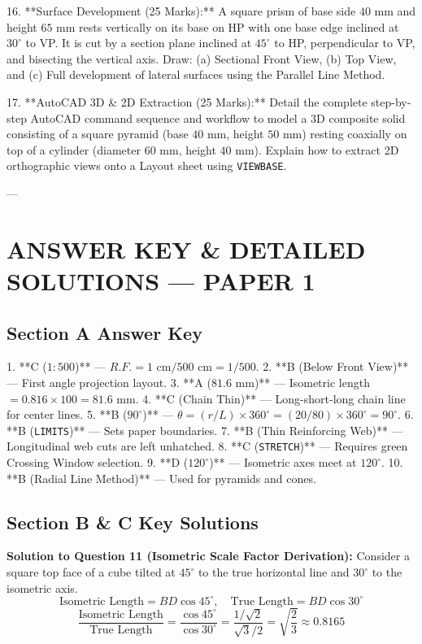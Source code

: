 16. **Surface Development (25 Marks):**  
    A square prism of base side $40\text{ mm}$ and height $65\text{ mm}$ rests vertically on its base on HP with one base edge inclined at $30^\circ$ to VP. It is cut by a section plane inclined at $45^\circ$ to HP, perpendicular to VP, and bisecting the vertical axis. Draw: (a) Sectional Front View, (b) Top View, and (c) Full development of lateral surfaces using the Parallel Line Method.

17. **AutoCAD 3D \& 2D Extraction (25 Marks):**  
    Detail the complete step-by-step AutoCAD command sequence and workflow to model a 3D composite solid consisting of a square pyramid (base $40\text{ mm}$, height $50\text{ mm}$) resting coaxially on top of a cylinder (diameter $60\text{ mm}$, height $40\text{ mm}$). Explain how to extract 2D orthographic views onto a Layout sheet using \texttt{VIEWBASE}.

---

\section{ANSWER KEY \& DETAILED SOLUTIONS — PAPER 1}

\subsection{Section A Answer Key}
1. **C ($1:500$)** — $R.F. = 1\text{ cm} / 500\text{ cm} = 1/500$.
2. **B (Below Front View)** — First angle projection layout.
3. **A ($81.6\text{ mm}$)** — Isometric length $= 0.816 \times 100 = 81.6\text{ mm}$.
4. **C (Chain Thin)** — Long-short-long chain line for center lines.
5. **B ($90^\circ$)** — $\theta = (r/L) \times 360^\circ = (20/80) \times 360^\circ = 90^\circ$.
6. **B (\texttt{LIMITS})** — Sets paper boundaries.
7. **B (Thin Reinforcing Web)** — Longitudinal web cuts are left unhatched.
8. **C (\texttt{STRETCH})** — Requires green Crossing Window selection.
9. **D ($120^\circ$)** — Isometric axes meet at $120^\circ$.
10. **B (Radial Line Method)** — Used for pyramids and cones.

\subsection{Section B \& C Key Solutions}

\noindent \textbf{Solution to Question 11 (Isometric Scale Factor Derivation):}  
Consider a square top face of a cube tilted at $45^\circ$ to the true horizontal line and $30^\circ$ to the isometric axis.
$$\text{Isometric Length} = B D \cos 45^\circ, \quad \text{True Length} = B D \cos 30^\circ$$
$$\frac{\text{Isometric Length}}{\text{True Length}} = \frac{\cos 45^\circ}{\cos 30^\circ} = \frac{1/\sqrt{2}}{\sqrt{3}/2} = \sqrt{\frac{2}{3}} \approx \mathbf{0.8165}$$

